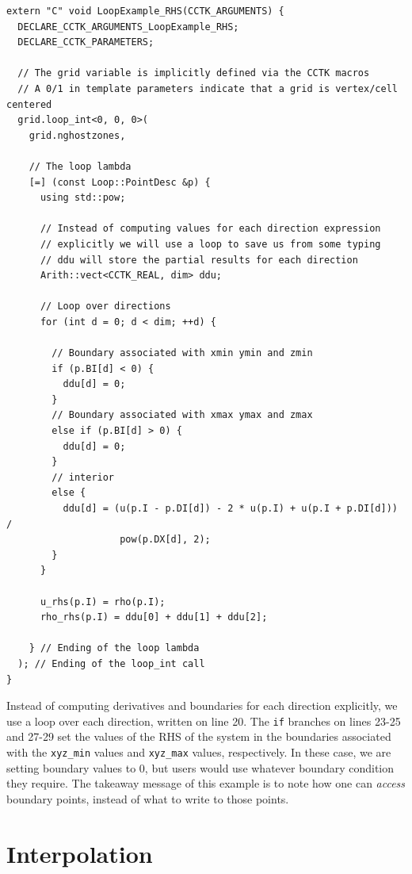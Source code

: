 \begin{verbatim}
extern "C" void LoopExample_RHS(CCTK_ARGUMENTS) {
  DECLARE_CCTK_ARGUMENTS_LoopExample_RHS;
  DECLARE_CCTK_PARAMETERS;

  // The grid variable is implicitly defined via the CCTK macros
  // A 0/1 in template parameters indicate that a grid is vertex/cell centered
  grid.loop_int<0, 0, 0>(
    grid.nghostzones,

    // The loop lambda
    [=] (const Loop::PointDesc &p) {
      using std::pow;

      // Instead of computing values for each direction expression
      // explicitly we will use a loop to save us from some typing
      // ddu will store the partial results for each direction
      Arith::vect<CCTK_REAL, dim> ddu;
      
      // Loop over directions
      for (int d = 0; d < dim; ++d) {
        
        // Boundary associated with xmin ymin and zmin
        if (p.BI[d] < 0) {
          ddu[d] = 0;
        }
        // Boundary associated with xmax ymax and zmax
        else if (p.BI[d] > 0) {
          ddu[d] = 0;
        }
        // interior
        else {
          ddu[d] = (u(p.I - p.DI[d]) - 2 * u(p.I) + u(p.I + p.DI[d])) /
                    pow(p.DX[d], 2);
        }
      }

      u_rhs(p.I) = rho(p.I);
      rho_rhs(p.I) = ddu[0] + ddu[1] + ddu[2];

    } // Ending of the loop lambda
  ); // Ending of the loop_int call
}
\end{verbatim}

Instead of computing derivatives and boundaries for each direction explicitly, we use a loop over each direction, written on line 20. The \texttt{if} branches on lines 23-25 and 27-29 set the values of the RHS of the system in the boundaries associated with the \texttt{xyz\_min} values and \texttt{xyz\_max} values, respectively. In these case, we are setting boundary values to $0$, but users would use whatever boundary condition they require. The takeaway message of this example is to note how one can \textit{access} boundary points, instead of what to write to those points.

\section{Interpolation}
\label{sec:interpolation}

